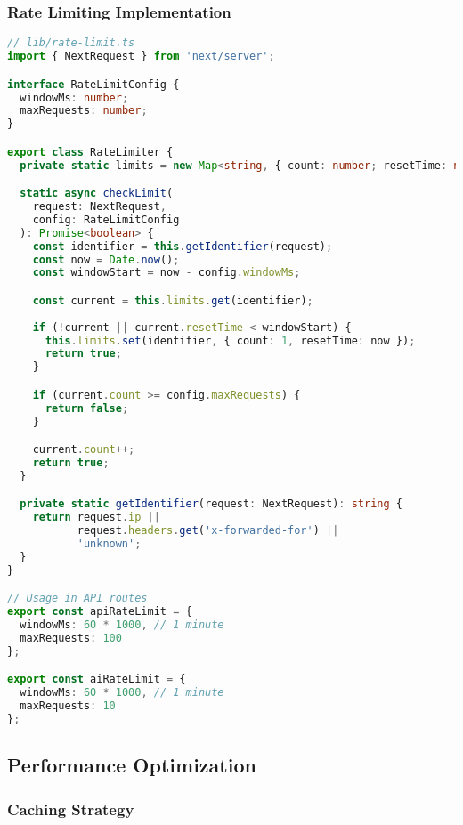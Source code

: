 \subsubsection{Rate Limiting Implementation}

\begin{lstlisting}[language=TypeScript, caption=Rate Limiting Configuration]
// lib/rate-limit.ts
import { NextRequest } from 'next/server';

interface RateLimitConfig {
  windowMs: number;
  maxRequests: number;
}

export class RateLimiter {
  private static limits = new Map<string, { count: number; resetTime: number }>();

  static async checkLimit(
    request: NextRequest, 
    config: RateLimitConfig
  ): Promise<boolean> {
    const identifier = this.getIdentifier(request);
    const now = Date.now();
    const windowStart = now - config.windowMs;

    const current = this.limits.get(identifier);
    
    if (!current || current.resetTime < windowStart) {
      this.limits.set(identifier, { count: 1, resetTime: now });
      return true;
    }

    if (current.count >= config.maxRequests) {
      return false;
    }

    current.count++;
    return true;
  }

  private static getIdentifier(request: NextRequest): string {
    return request.ip || 
           request.headers.get('x-forwarded-for') || 
           'unknown';
  }
}

// Usage in API routes
export const apiRateLimit = {
  windowMs: 60 * 1000, // 1 minute
  maxRequests: 100
};

export const aiRateLimit = {
  windowMs: 60 * 1000, // 1 minute
  maxRequests: 10
};
\end{lstlisting}

\subsection{Performance Optimization}

\subsubsection{Caching Strategy}

